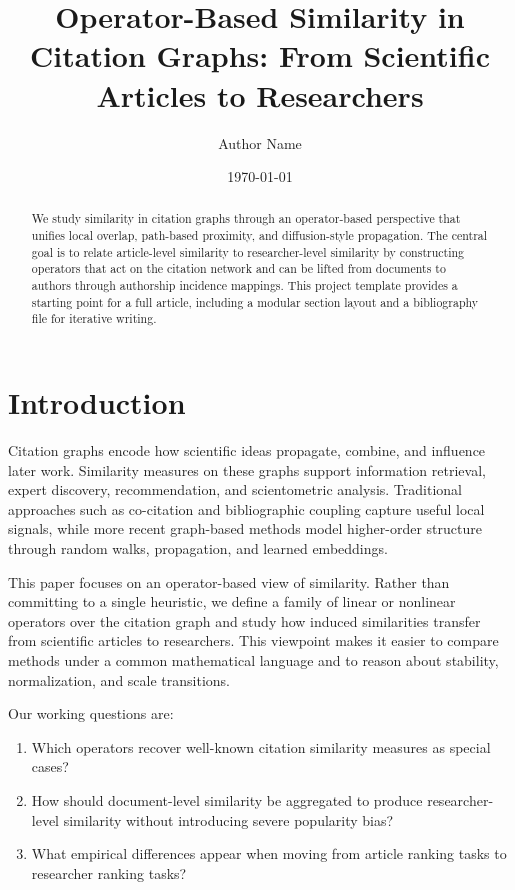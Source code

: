 \documentclass[11pt]{article}
\title{Operator-Based Similarity in Citation Graphs: From Scientific Articles to Researchers}
\author{Author Name}
\date{\today}
\begin{document}
\maketitle

\begin{abstract}
We study similarity in citation graphs through an operator-based perspective that unifies
local overlap, path-based proximity, and diffusion-style propagation. The central goal is
to relate article-level similarity to researcher-level similarity by constructing operators
that act on the citation network and can be lifted from documents to authors through
authorship incidence mappings. This project template provides a starting point for a full
article, including a modular section layout and a bibliography file for iterative writing.
\end{abstract}

\section{Introduction}

Citation graphs encode how scientific ideas propagate, combine, and influence later work.
Similarity measures on these graphs support information retrieval, expert discovery,
recommendation, and scientometric analysis. Traditional approaches such as co-citation and
bibliographic coupling capture useful local signals, while more recent graph-based methods
model higher-order structure through random walks, propagation, and learned embeddings.

This paper focuses on an operator-based view of similarity. Rather than committing to a
single heuristic, we define a family of linear or nonlinear operators over the citation
graph and study how induced similarities transfer from scientific articles to researchers.
This viewpoint makes it easier to compare methods under a common mathematical language and
to reason about stability, normalization, and scale transitions.

Our working questions are:
\begin{enumerate}[label=(Q\arabic*)]
    \item Which operators recover well-known citation similarity measures as special cases?
    \item How should document-level similarity be aggregated to produce researcher-level
    similarity without introducing severe popularity bias?
    \item What empirical differences appear when moving from article ranking tasks to
    researcher ranking tasks?
\end{enumerate}
\end{document}
